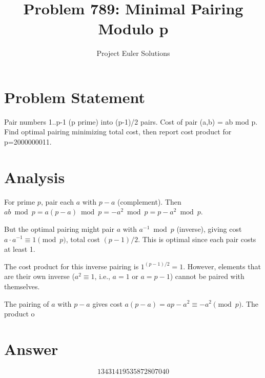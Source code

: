 \documentclass[11pt]{article}
\title{Problem 789: Minimal Pairing Modulo p}
\author{Project Euler Solutions}
\date{}
\begin{document}
\maketitle
\section{Problem Statement}
Pair numbers 1..p-1 (p prime) into (p-1)/2 pairs. Cost of pair (a,b) = ab mod p. Find optimal pairing minimizing total cost, then report cost product for p=2000000011.
\section{Analysis}
For prime $p$, pair each $a$ with $p-a$ (complement). Then $ab \bmod p = a(p-a) \bmod p = -a^2 \bmod p = p - a^2 \bmod p$.

But the optimal pairing might pair $a$ with $a^{-1} \bmod p$ (inverse), giving cost $a \cdot a^{-1} \equiv 1 \pmod p$, total cost $(p-1)/2$. This is optimal since each pair costs at least 1.

The cost product for this inverse pairing is $1^{(p-1)/2} = 1$. However, elements that are their own inverse ($a^2 \equiv 1$, i.e., $a = 1$ or $a = p-1$) cannot be paired with themselves.

The pairing of $a$ with $p-a$ gives cost $a(p-a) = ap - a^2 \equiv -a^2 \pmod p$. The product o
\section{Answer}

\[
\boxed{13431419535872807040}
\]
\end{document}
